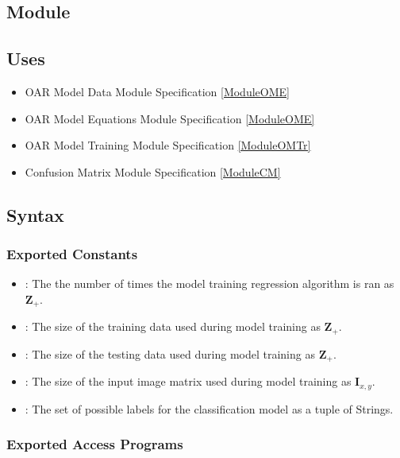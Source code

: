 \documentclass[12pt, titlepage]{article}
\begin{document}
\subsection{Module}


\subsection{Uses}

\begin{itemize}
  \item OAR Model Data Module Specification \ref{ModuleOME}
  \item OAR Model Equations Module Specification \ref{ModuleOME}
  \item OAR Model Training Module Specification \ref{ModuleOMTr}
  \item Confusion Matrix Module Specification \ref{ModuleCM}
\end{itemize}

\subsection{Syntax}

\subsubsection{Exported Constants}

\begin{itemize}
\item {}: The the number of times the model training regression algorithm is ran as $\mathbf{Z}_{+}$.
\item {}: The size of the training data used during model training as $\mathbf{Z}_{+}$.
\item {}: The size of the testing data used during model training as $\mathbf{Z}_{+}$.
\item {}: The size of the input image matrix used during model training as $\mathbf{I}_{x,y}$.
\item {}: The set of possible labels for the classification model as a tuple of Strings.
\end{itemize}

\subsubsection{Exported Access Programs}
\end{document}
